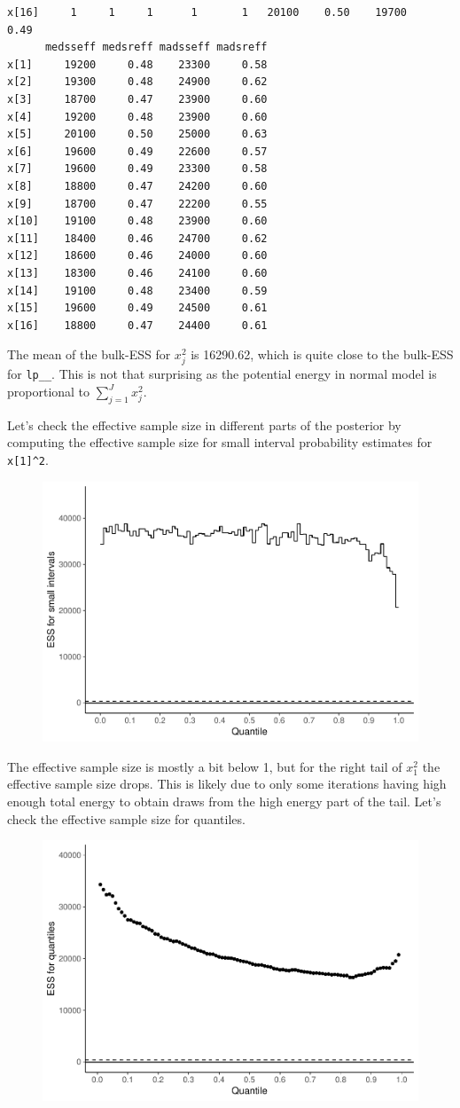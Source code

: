 \documentclass[american,]{article}
\begin{document}
\begin{verbatim}
x[16]     1     1     1      1       1   20100    0.50    19700     0.49
      medsseff medsreff madsseff madsreff
x[1]     19200     0.48    23300     0.58
x[2]     19300     0.48    24900     0.62
x[3]     18700     0.47    23900     0.60
x[4]     19200     0.48    23900     0.60
x[5]     20100     0.50    25000     0.63
x[6]     19600     0.49    22600     0.57
x[7]     19600     0.49    23300     0.58
x[8]     18800     0.47    24200     0.60
x[9]     18700     0.47    22200     0.55
x[10]    19100     0.48    23900     0.60
x[11]    18400     0.46    24700     0.62
x[12]    18600     0.46    24000     0.60
x[13]    18300     0.46    24100     0.60
x[14]    19100     0.48    23400     0.59
x[15]    19600     0.49    24500     0.61
x[16]    18800     0.47    24400     0.61
\end{verbatim}

The mean of the bulk-ESS for \(x_j^2\) is 16290.62, which is quite close
to the bulk-ESS for \texttt{lp\_\_}. This is not that surprising as the
potential energy in normal model is proportional to
\(\sum_{j=1}^J x_j^2\).

Let's check the effective sample size in different parts of the
posterior by computing the effective sample size for small interval
probability estimates for \texttt{x{[}1{]}\^{}2}.

\begin{figure}[tp]
  \centering
  \includegraphics[width=0.6\linewidth]{graphics/local-ess-fit-n-2-1.pdf}
\end{figure}

The effective sample size is mostly a bit below 1, but for the right
tail of \(x_1^2\) the effective sample size drops. This is likely due to
only some iterations having high enough total energy to obtain draws
from the high energy part of the tail. Let's check the effective sample
size for quantiles.

\begin{figure}[tp]
  \centering
  \includegraphics[width=0.6\linewidth]{graphics/quantile-ess-fit-n-2-1.pdf}
\end{figure}
\end{document}
